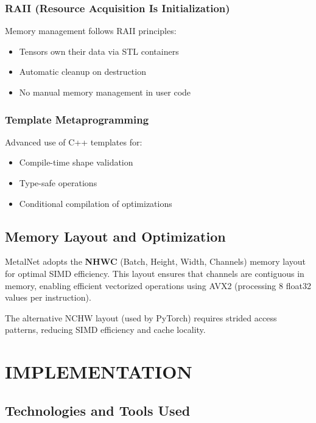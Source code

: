\documentclass[12pt,oneside,a4paper]{report}
\begin{document}
\subsection{RAII (Resource Acquisition Is Initialization)}

Memory management follows RAII principles:
\begin{itemize}
    \item Tensors own their data via STL containers
    \item Automatic cleanup on destruction
    \item No manual memory management in user code
\end{itemize}

\subsection{Template Metaprogramming}

Advanced use of C++ templates for:
\begin{itemize}
    \item Compile-time shape validation
    \item Type-safe operations
    \item Conditional compilation of optimizations
\end{itemize}

\section{Memory Layout and Optimization}

MetalNet adopts the \textbf{NHWC} (Batch, Height, Width, Channels) memory layout for optimal SIMD efficiency. This layout ensures that channels are contiguous in memory, enabling efficient vectorized operations using AVX2 (processing 8 float32 values per instruction).

The alternative NCHW layout (used by PyTorch) requires strided access patterns, reducing SIMD efficiency and cache locality.

\newpage

\chapter{IMPLEMENTATION}

\section{Technologies and Tools Used}
\end{document}
